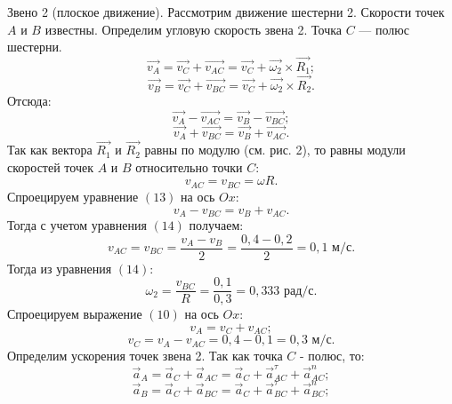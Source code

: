 \documentclass{article}
\begin{document}
Звено 2 (плоское движение). Рассмотрим движение шестерни 2. Скорости точек $A$ и $B$ известны. Определим угловую скорость звена 2. Точка $C$ — полюс шестерни. 
\begin{equation}
    \vec{v_A} = \vec{v_C} + \vec{v_{AC}} = \vec{v_C} + \vec{\omega_2} \times \vec{R_1} ;
\end{equation}
\begin{equation}
    \vec{v_B} = \vec{v_C} + \vec{v_{BC}} = \vec{v_C} + \vec{\omega_2} \times \vec{R_2}.
\end{equation}
\medskip
Отсюда:
\begin{equation}
    \vec{v_A} - \vec{v_{AC}} = \vec{v_B} - \vec{v_{BC}};
\end{equation}
\begin{equation}
    \vec{v_A} + \vec{v_{BC}} = \vec{v_B} + \vec{v_{AC}}.
\end{equation}
\medskip
Так как вектора $\vec{R_1}$ и $\vec{R_2}$ равны по модулю (см. рис. 2), то равны модули скоростей точек $A$ и $B$ относительно точки $C$:
\begin{equation}
    {v}_{AC}={v}_{BC} = \omega R.
\end{equation}
Спроецируем уравнение $(13)$ на ось $Ox$:
\begin{equation}
    {v_A} - {v_{BC}} = {v_B} + {v_{AC}}.
\end{equation}
\medskip
Тогда с учетом уравнения $(14)$ получаем:
\begin{equation}
v_{AC} = v_{BC} = \frac{v_A - v_B}{2} = \frac{0,4 - 0,2}{2} = 0,1 \text{ м/с}.
\end{equation}
Тогда из уравнения $(14)$:
\begin{equation}
\omega_2 = \frac{v_{BC}}{R} = \frac{0,1}{0,3} = 0,333 \text{ рад/с}.
\end{equation}
Спроецируем выражение $(10)$ на ось $Ox$:
\begin{equation}
    v_A = v_C + v_{AC};
\end{equation}
\begin{equation}
v_C = v_A - v_{AC} = 0,4 - 0,1 = 0,3 \text{ м/с}.
\end{equation}
\medskip
Определим ускорения точек звена 2. Так как точка $C$ - полюс, то:
\begin{equation}
    \vec{a}_A = \vec{a}_C + \vec{a}_{AC} = \vec{a}_C + \vec{a}_{AC}^\tau + \vec{a}_{AC}^n;
\end{equation}
\begin{equation}
    \vec{a}_B = \vec{a}_C + \vec{a}_{BC} = \vec{a}_C + \vec{a}_{BC}^\tau + \vec{a}_{BC}^n;
\end{equation}
\end{document}

